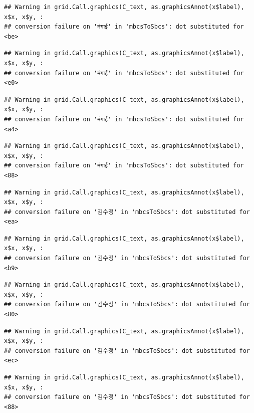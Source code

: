 \documentclass[
]{article}
\begin{document}
\begin{verbatim}
## Warning in grid.Call.graphics(C_text, as.graphicsAnnot(x$label), x$x, x$y, :
## conversion failure on 'मंगाई' in 'mbcsToSbcs': dot substituted for <be>
\end{verbatim}

\begin{verbatim}
## Warning in grid.Call.graphics(C_text, as.graphicsAnnot(x$label), x$x, x$y, :
## conversion failure on 'मंगाई' in 'mbcsToSbcs': dot substituted for <e0>
\end{verbatim}

\begin{verbatim}
## Warning in grid.Call.graphics(C_text, as.graphicsAnnot(x$label), x$x, x$y, :
## conversion failure on 'मंगाई' in 'mbcsToSbcs': dot substituted for <a4>
\end{verbatim}

\begin{verbatim}
## Warning in grid.Call.graphics(C_text, as.graphicsAnnot(x$label), x$x, x$y, :
## conversion failure on 'मंगाई' in 'mbcsToSbcs': dot substituted for <88>
\end{verbatim}

\begin{verbatim}
## Warning in grid.Call.graphics(C_text, as.graphicsAnnot(x$label), x$x, x$y, :
## conversion failure on '김수정' in 'mbcsToSbcs': dot substituted for <ea>
\end{verbatim}

\begin{verbatim}
## Warning in grid.Call.graphics(C_text, as.graphicsAnnot(x$label), x$x, x$y, :
## conversion failure on '김수정' in 'mbcsToSbcs': dot substituted for <b9>
\end{verbatim}

\begin{verbatim}
## Warning in grid.Call.graphics(C_text, as.graphicsAnnot(x$label), x$x, x$y, :
## conversion failure on '김수정' in 'mbcsToSbcs': dot substituted for <80>
\end{verbatim}

\begin{verbatim}
## Warning in grid.Call.graphics(C_text, as.graphicsAnnot(x$label), x$x, x$y, :
## conversion failure on '김수정' in 'mbcsToSbcs': dot substituted for <ec>
\end{verbatim}

\begin{verbatim}
## Warning in grid.Call.graphics(C_text, as.graphicsAnnot(x$label), x$x, x$y, :
## conversion failure on '김수정' in 'mbcsToSbcs': dot substituted for <88>
\end{verbatim}
\end{document}
